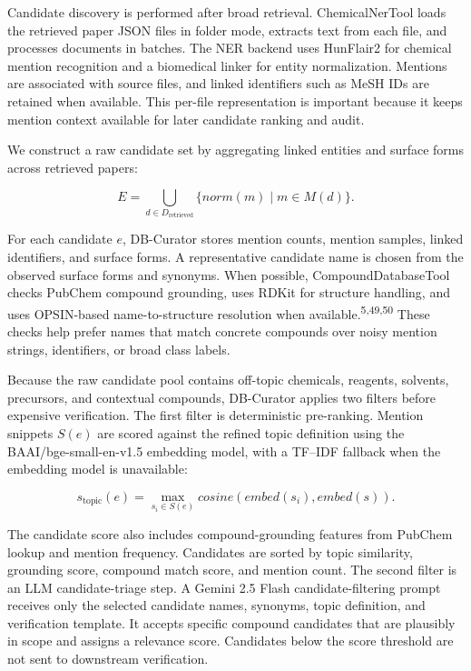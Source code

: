 \documentclass[
]{article}
\begin{document}
Candidate discovery is performed after broad retrieval. ChemicalNerTool
loads the retrieved paper JSON files in folder mode, extracts text from
each file, and processes documents in batches. The NER backend uses
HunFlair2 for chemical mention recognition and a biomedical linker for
entity normalization. Mentions are associated with source files, and
linked identifiers such as MeSH IDs are retained when available. This
per-file representation is important because it keeps mention context
available for later candidate ranking and audit.

We construct a raw candidate set by aggregating linked entities and
surface forms across retrieved papers:

\[E = \bigcup_{d \in D_{\text{retrieved}}}\{norm(m) \mid m \in M(d)\}.\]

For each candidate \(e\), DB-Curator stores mention counts, mention
samples, linked identifiers, and surface forms. A representative
candidate name is chosen from the observed surface forms and synonyms.
When possible, CompoundDatabaseTool checks PubChem compound grounding,
uses RDKit for structure handling, and uses OPSIN-based name-to-structure
resolution when available.\textsuperscript{5,49,50} These checks help
prefer names that match concrete compounds over noisy mention strings,
identifiers, or broad class labels.

Because the raw candidate pool contains off-topic chemicals, reagents,
solvents, precursors, and contextual compounds, DB-Curator applies two
filters before expensive verification. The first filter is deterministic
pre-ranking. Mention snippets \(S(e)\) are scored against the refined
topic definition using the BAAI/bge-small-en-v1.5 embedding model, with
a TF--IDF fallback when the embedding model is unavailable:

\[s_{\text{topic}}(e)=\max_{s_i \in S(e)} cosine(embed(s_i),embed(s)).\]

The candidate score also includes compound-grounding features from
PubChem lookup and mention frequency. Candidates are sorted by topic
similarity, grounding score, compound match score, and mention count.
The second filter is an LLM candidate-triage step. A Gemini 2.5 Flash
candidate-filtering prompt receives only the selected candidate names,
synonyms, topic definition, and verification template. It accepts
specific compound candidates that are plausibly in scope and assigns a
relevance score. Candidates below the score threshold are not sent to
downstream verification.
\end{document}
